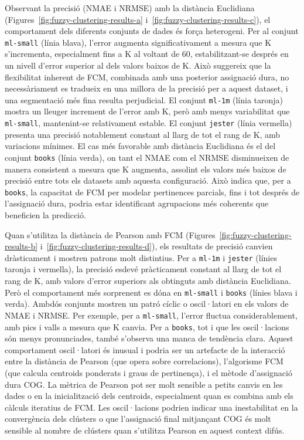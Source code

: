 \documentclass[a4paper,12pt]{report}
\begin{document}
Observant la precisió (NMAE i NRMSE) amb la distància Euclidiana (Figures~\ref{fig:fuzzy-clustering-results-a} i~\ref{fig:fuzzy-clustering-results-c}), el comportament dels diferents conjunts de dades és força heterogeni. Per al conjunt \texttt{ml-small} (línia blava), l'error augmenta significativament a mesura que K s'incrementa, especialment fins a K al voltant de 60, estabilitzant-se després en un nivell d'error superior al dels valors baixos de K. Això suggereix que la flexibilitat inherent de FCM, combinada amb una posterior assignació dura, no necessàriament es tradueix en una millora de la precisió per a aquest dataset, i una segmentació més fina resulta perjudicial. El conjunt \texttt{ml-1m} (línia taronja) mostra un lleuger increment de l'error amb K, però amb menys variabilitat que \texttt{ml-small}, mantenint-se relativament estable. El conjunt \texttt{jester} (línia vermella) presenta una precisió notablement constant al llarg de tot el rang de K, amb variacions mínimes. El cas més favorable amb distància Euclidiana és el del conjunt \texttt{books} (línia verda), on tant el NMAE com el NRMSE disminueixen de manera consistent a mesura que K augmenta, assolint els valors més baixos de precisió entre tots els datasets amb aquesta configuració. Això indica que, per a \texttt{books}, la capacitat de FCM per modelar pertinences parcials, fins i tot després de l'assignació dura, podria estar identificant agrupacions més coherents que beneficien la predicció.

Quan s'utilitza la distància de Pearson amb FCM (Figures~\ref{fig:fuzzy-clustering-results-b} i~\ref{fig:fuzzy-clustering-results-d}), els resultats de precisió canvien dràsticament i mostren patrons molt distintius. Per a \texttt{ml-1m} i \texttt{jester} (línies taronja i vermella), la precisió esdevé pràcticament constant al llarg de tot el rang de K, amb valors d'error superiors als obtinguts amb distància Euclidiana. Però el comportament més sorprenent es dóna en \texttt{ml-small} i \texttt{books} (línies blava i verda). Ambdós conjunts mostren un patró cíclic o oscil·latori en els valors de NMAE i NRMSE. Per exemple, per a \texttt{ml-small}, l'error fluctua considerablement, amb pics i valls a mesura que K canvia. Per a \texttt{books}, tot i que les oscil·lacions són menys pronunciades, també s'observa una manca de tendència clara. Aquest comportament oscil·latori és inusual i podria ser un artefacte de la interacció entre la distància de Pearson (que opera sobre correlacions), l'algorisme FCM (que calcula centroids ponderats i graus de pertinença), i el mètode d'assignació dura COG. La mètrica de Pearson pot ser molt sensible a petits canvis en les dades o en la inicialització dels centroids, especialment quan es combina amb els càlculs iteratius de FCM. Les oscil·lacions podrien indicar una inestabilitat en la convergència dels clústers o que l'assignació final mitjançant COG és molt sensible al nombre de clústers quan s'utilitza Pearson en aquest context difús.
\end{document}
